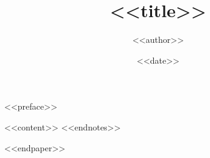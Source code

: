 \documentclass[12pt, b6paper, openany]{memoir}
\author{<<author>>}
\title{<<title>>}
\date{<<date>>}
\newenvironment{lastnote}{%
	\clearpage\vspace*{\fill}%
	\begin{footnotesize}
}{%
	\end{footnotesize}
}
\begin{document}
	\frontmatter
		\begin{titlingpage}
		\maketitle
		\end{titlingpage}
		\tableofcontents
<<preface>>

	\mainmatter
<<content>>
	\backmatter
\appendix
<<endnotes>>
\begin{lastnote}
<<endpaper>>
\end{lastnote}
\end{document}
